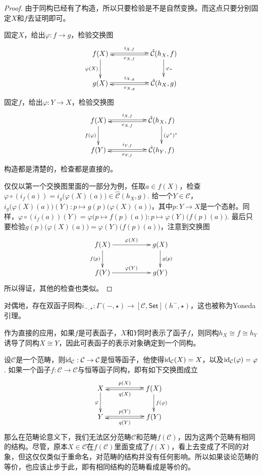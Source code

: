 \begin{proof}
	由于同构已经有了构造，所以只要检验是不是自然变换。而这点只要分别固定$X$和$f$去证明即可。

	固定$X$，给出$\varphi:f\to g$，检验交换图
	\[
	\begin{xy}
		\xymatrix{
			f(X)\ar@<0.3ex>[rr]^-{i_{X,f}} \ar[d]_{\varphi(X)}&&{\hat{\mathcal{C}}}(h_X,f) \ar[d]^{\varphi_*}\ar@<0.3ex>[ll]^-{e_{X,f}}\\
			g(X)\ar@<0.3ex>[rr]^-{i_{X,g}}&&{\hat{\mathcal{C}}}(h_X,g)\ar@<0.3ex>[ll]^-{e_{X,g}}
		}
	\end{xy}
	\]
	固定$f$，给出$\varphi:Y\to X$，检验交换图
	\[
	\begin{xy}
		\xymatrix{
			f(X)\ar@<0.3ex>[rr]^-{i_{X,f}} \ar[d]_{f(\varphi)}&&{\hat{\mathcal{C}}}(h_X,f) \ar[d]^{(\varphi^*)^*}\ar@<0.3ex>[ll]^-{e_{X,f}}\\
			f(Y)\ar@<0.3ex>[rr]^-{i_{Y,f}}&&{\hat{\mathcal{C}}}(h_Y,f)\ar@<0.3ex>[ll]^-{e_{Y,f}}
		}
	\end{xy}
	\]
	构造都是清楚的，检查都是直接的。
	
	仅仅以第一个交换图里面的一部分为例，任取$a\in f(X)$，检查$\varphi\circ (i_f(a))=i_g\bigl(\varphi(X)(a)\bigr)\in {\hat{\mathcal{C}}}(h_X,g)$. 给一个$Y\in \mathcal{C}$，$i_g\bigl(\varphi(X)(a)\bigr)(Y):p\mapsto g(p)\bigl (\varphi(X)(a)\bigr)$，其中$p:Y\to X$是一个态射。同样，$\varphi\circ (i_f(a))(Y)=\varphi\bigl(p\mapsto f(p)(a)\bigr):p\mapsto \varphi(Y)\bigl(f(p)(a)\bigr)$. 最后只要检验$g(p)\bigl (\varphi(X)(a)\bigr)=\varphi(Y)\bigl(f(p)(a)\bigr)$，注意到交换图
	\[
	\begin{xy}
		\xymatrix{
			f(X)\ar[rr]^{\varphi(X)} \ar[d]_{f(p)}&&g(X) \ar[d]^{g(p)}\\
			f(Y)\ar[rr]^{\varphi(Y)}&&g(Y)
		}
	\end{xy}
	\]
	所以得证，其他的检查也类似。
\end{proof}

\begin{pro}[Yoneda引理]
对偶地，存在双函子同构$i_{-,\star}:\Gamma(-,\star)\to [\mathcal{C},\mathsf{Set}](h^-,\star)$，这也被称为Yoneda引理。
\end{pro}

\para 作为直接的应用，如果$f$是可表函子，$X$和$Y$同时表示了函子$f$，则同构$h_X\cong f \cong h_Y$诱导了同构$X\cong Y$，因此可表函子的表示对象确定到一个同构。 

\para 设$\mathcal{C}$是一个范畴，则$\operatorname{id}_\mathcal{C}:\mathcal{C}\to \mathcal{C}$是恒等函子，他使得$\operatorname{id}_\mathcal{C}(X)=X$，以及$\operatorname{id}_\mathcal{C}(\varphi)=\varphi$. 如果一个函子$f:\mathcal{C}\to\mathcal{C}$与恒等函子同构，即有如下交换图成立
\[
\begin{xy}
	\xymatrix{
		X\ar@<0.3ex>[rr]^-{p(X)} \ar[d]_{\varphi}&&f(X) \ar[d]^{f(\varphi)}\ar@<0.3ex>[ll]^-{q(X)}\\
		Y\ar@<0.3ex>[rr]^-{p(Y)}&&f(Y)\ar@<0.3ex>[ll]^-{q(Y)}
	}
\end{xy}
\]
那么在范畴论意义下，我们无法区分范畴$\mathcal{C}$和范畴$f(\mathcal{C})$，因为这两个范畴有相同的结构。尽管，原本$X\in \mathcal{C}$在$f(\mathcal{C})$里面变成了$f(X)$，看上去变成了不同的对象，但这仅仅类似于重命名，对范畴的结构并没有任何影响。所以如果谈论范畴的等价，也应该止步于此，即有相同结构的范畴看成是等价的。

